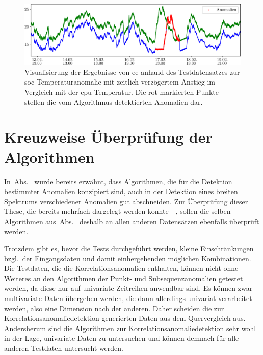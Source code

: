 \begin{figure}[H]
    \centering
        \includegraphics[width=1\linewidth]{ch5_anomalieerkennung/abbildungen/EE_Ergebnis_SOC2.pdf}
    \caption{\centering Visualisierung der Ergebnisse von \acs*{ee} anhand des Testdatensatzes zur \acs{soc} Temperaturanomalie mit zeitlich verzögertem Anstieg im Vergleich mit der \acs{cpu}
    Temperatur. Die rot markierten Punkte stellen die vom Algorithmus detektierten Anomalien dar.}
    \label{fig:EE_bsp_SOC2}
\end{figure}

\section{Kreuzweise Überprüfung der Algorithmen}
In~\hyperref[sec:anomaliearten]{Abs.~} wurde bereits erwähnt, dass Algorithmen, die für die Detektion bestimmter Anomalien konzipiert
sind, auch in der Detektion eines breiten Spektrums verschiedener Anomalien gut abschneiden. Zur Überprüfung dieser These, die bereits mehrfach dargelegt
werden konnte~\cite[S.~30~-~31]{Wenig2024}~\cite{Schmidl2022}, sollen die selben Algorithmen aus~\hyperref[sec:algorithmen]{Abs.~} deshalb
an allen anderen Datensätzen ebenfalls überprüft werden.

Trotzdem gibt es, bevor die Tests durchgeführt werden, kleine Einschränkungen bzgl.~der Eingangsdaten und damit einhergehenden möglichen Kombinationen. Die
Testdaten, die die Korrelationsanomalien enthalten, können nicht ohne Weiteres an den Algorithmen der Punkt- und Subsequenzanomalien getestet werden, da
diese nur auf univariate Zeitreihen anwendbar sind. Es können zwar multivariate Daten übergeben werden, die dann allerdings univariat verarbeitet werden, also eine
Dimension nach der anderen. Daher scheiden die zur Korrelationsanomaliedetektion generierten Daten aus dem Quervergleich aus. Andersherum sind die Algorithmen
zur Korrelationsanomaliedetektion sehr wohl in der Lage, univariate Daten zu untersuchen und können demnach für alle anderen Testdaten untersucht werden.

